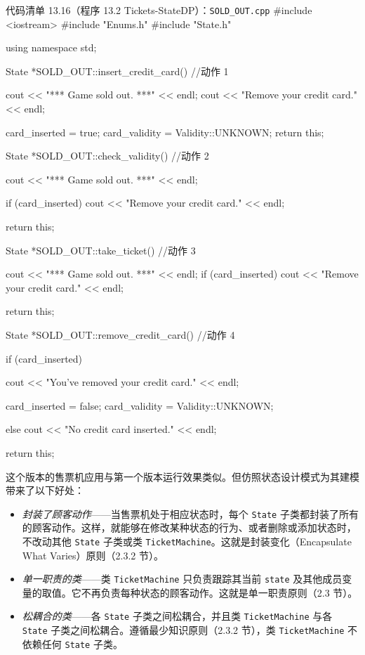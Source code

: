 \begin{codeboxt}{代码清单 13.16（程序 13.2 Tickets-StateDP）：\texttt{SOLD\_\allowbreak{}OUT.\allowbreak{}cpp}}
#include <iostream>
#include "Enums.h"
#include "State.h"

using namespace std;

State *SOLD_OUT::insert_credit_card()  //动作 1
{
    cout << "*** Game sold out. ***" << endl;
    cout << "Remove your credit card." << endl;

    card_inserted = true;
    card_validity = Validity::UNKNOWN;
    return this;
}

State *SOLD_OUT::check_validity()  //动作 2
{
    cout << "*** Game sold out. ***" << endl;

    if (card_inserted)
    {
        cout << "Remove your credit card." << endl;
    }

    return this;
}

State *SOLD_OUT::take_ticket()  //动作 3
{
    cout << "*** Game sold out. ***" << endl;
    if (card_inserted)
    {
        cout << "Remove your credit card." << endl;
    }

    return this;
}

State *SOLD_OUT::remove_credit_card()  //动作 4
{
    if (card_inserted)
    {
        cout << "You’ve removed your credit card." << endl;

        card_inserted = false;
        card_validity = Validity::UNKNOWN;
    }
    else
    {
        cout << "No credit card inserted." << endl;
    }

    return this;
}
\end{codeboxt}

这个版本的售票机应用与第一个版本运行效果类似。但仿照状态设计模式为其建模带来了以下好处：

\begin{itemize}
\item \emph{封装了顾客动作}——当售票机处于相应状态时，每个 \texttt{State} 子类都封装了所有的顾客动作。这样，就能够在修改某种状态的行为、或者删除或添加状态时，不改动其他 \texttt{State} 子类或类 \texttt{Ticket\allowbreak{}Machine}。这就是封装变化（Encapsulate What Varies）原则（2.3.2 节）。
\item \emph{单一职责的类}——类 \texttt{Ticket\allowbreak{}Machine} 只负责跟踪其当前 \texttt{state} 及其他成员变量的取值。它不再负责每种状态的顾客动作。这就是单一职责原则（2.3 节）。
\item \emph{松耦合的类}——各 \texttt{State} 子类之间松耦合，并且类 \texttt{Ticket\allowbreak{}Machine} 与各 \texttt{State} 子类之间松耦合。遵循最少知识原则（2.3.2 节），类 \texttt{Ticket\allowbreak{}Machine} 不依赖任何 \texttt{State} 子类。
\end{itemize}

